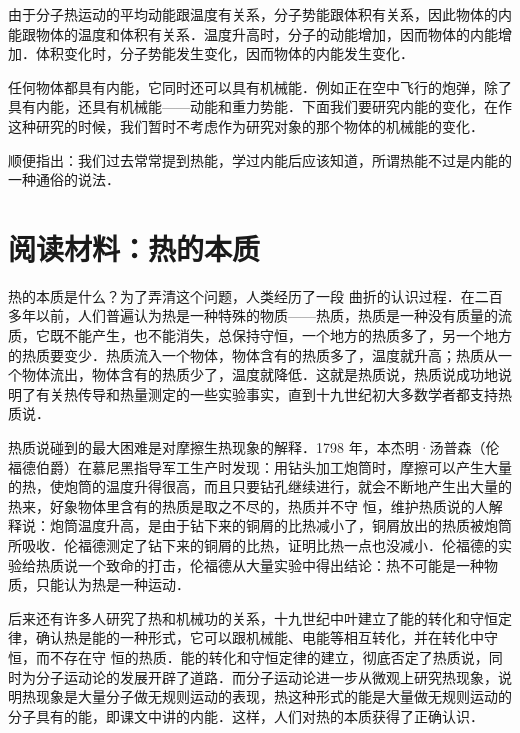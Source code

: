 由于分子热运动的平均动能跟温度有关系，分子势能跟体积有关系，因此物体的内能跟物体的温度和体积有关系．温度升高时，分子的动能增加，因而物体的内能增加．体积变化时，分子势能发生变化，因而物体的内能发生变化．

任何物体都具有内能，它同时还可以具有机械能．例如正在空中飞行的炮弹，除了具有内能，还具有机械能——动能和重力势能．下面我们要研究内能的变化，在作这种研究的时候，我们暂时不考虑作为研究对象的那个物体的机械能的变化．

顺便指出：我们过去常常提到热能，学过内能后应该知道，所谓热能不过是内能的一种通俗的说法．

\section*{阅读材料：热的本质}
热的本质是什么？为了弄清这个问题，人类经历了一段
曲折的认识过程．在二百多年以前，人们普遍认为热是一种特殊的物质——热质，热质是一种没有质量的流质，它既不能产生，也不能消失，总保持守恒，一个地方的热质多了，另一个地方的热质要变少．热质流入一个物体，物体含有的热质多了，温度就升高；热质从一个物体流出，物体含有的热质少了，温度就降低．这就是热质说，热质说成功地说明了有关热传导和热量测定的一些实验事实，直到十九世纪初大多数学者都支持热质说．

热质说碰到的最大困难是对摩擦生热现象的解释．1798
年，本杰明·汤普森（伦福德伯爵）在慕尼黑指导军工生产时发现：用钻头加工炮筒时，摩擦可以产生大量的热，使炮筒的温度升得很高，而且只要钻孔继续进行，就会不断地产生出大量的热来，好象物体里含有的热质是取之不尽的，热质并不守
恒，维护热质说的人解释说：炮筒温度升高，是由于钻下来的铜屑的比热减小了，铜屑放出的热质被炮筒所吸收．伦福德测定了钻下来的铜屑的比热，证明比热一点也没减小．伦福德的实验给热质说一个致命的打击，伦福德从大量实验中得出结论：热不可能是一种物质，只能认为热是一种运动．

后来还有许多人研究了热和机械功的关系，十九世纪中叶建立了能的转化和守恒定律，确认热是能的一种形式，它可以跟机械能、电能等相互转化，并在转化中守恒，而不存在守
恒的热质．能的转化和守恒定律的建立，彻底否定了热质说，同时为分子运动论的发展开辟了道路．而分子运动论进一步从微观上研究热现象，说明热现象是大量分子做无规则运动的表现，热这种形式的能是大量做无规则运动的分子具有的能，即课文中讲的内能．这样，人们对热的本质获得了正确认识．


